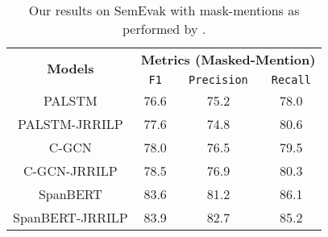 \begin{table}[!t]
\centering
\begin{adjustbox}{width=.8\columnwidth}
\begin{tabular}{cccc}
\toprule
\multirow{2}{*}{\textbf{Models}} & \multicolumn{3}{c}{\textbf{Metrics (Masked-Mention)}} \\
\cmidrule{2-4}
& \texttt{F1} & \texttt{Precision} & \texttt{Recall} \\
\midrule                
PALSTM        & 76.6 & 75.2 & 78.0 \\
PALSTM-JRRILP & 77.6 & 74.8 & 80.6 \\
\midrule
C-GCN        & 78.0 & 76.5 & 79.5 \\
C-GCN-JRRILP & 78.5 & 76.9 & 80.3 \\
\midrule
SpanBERT        & 83.6 & 81.2 & 86.1 \\
SpanBERT-JRRILP & 83.9 & 82.7 & 85.2 \\

\bottomrule
\end{tabular}
\end{adjustbox}
\caption{
Our results on SemEvak with mask-mentions as performed by \cite{palstm, cgcn}. \\}
\label{tab:semeval_results}
\end{table}